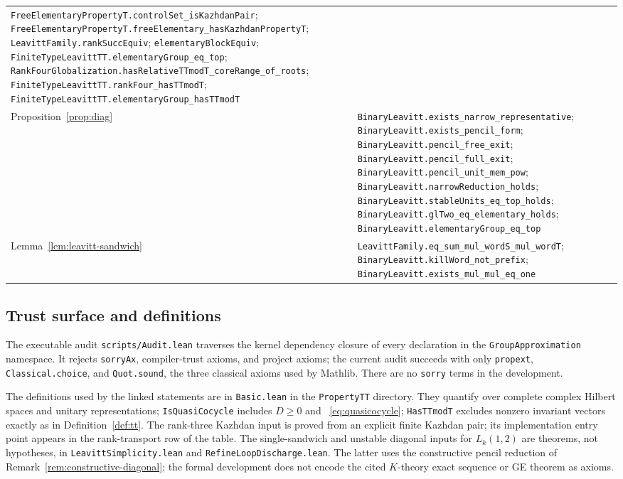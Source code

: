 \documentclass[11pt]{amsart}
\theoremstyle{definition}
\theoremstyle{plain}
\begin{document}
\begin{tabularx}{\textwidth}{@{}>{\raggedright\arraybackslash}p{}>{\raggedright\arraybackslash}X@{}}
\nolinkurl{FreeElementaryPropertyT.controlSet_isKazhdanPair};
\nolinkurl{FreeElementaryPropertyT.freeElementary_hasKazhdanPropertyT};
\nolinkurl{LeavittFamily.rankSuccEquiv};
\nolinkurl{elementaryBlockEquiv};
\nolinkurl{FiniteTypeLeavittTT.elementaryGroup_eq_top};
\nolinkurl{RankFourGlobalization.hasRelativeTTmodT_coreRange_of_roots};
\nolinkurl{FiniteTypeLeavittTT.rankFour_hasTTmodT};
\nolinkurl{FiniteTypeLeavittTT.elementaryGroup_hasTTmodT} \\
Proposition~\ref{prop:diag} &
\nolinkurl{BinaryLeavitt.exists_narrow_representative};
\nolinkurl{BinaryLeavitt.exists_pencil_form};
\nolinkurl{BinaryLeavitt.pencil_free_exit};
\nolinkurl{BinaryLeavitt.pencil_full_exit};
\nolinkurl{BinaryLeavitt.pencil_unit_mem_pow};
\nolinkurl{BinaryLeavitt.narrowReduction_holds};
\nolinkurl{BinaryLeavitt.stableUnits_eq_top_holds};
\nolinkurl{BinaryLeavitt.glTwo_eq_elementary_holds};
\nolinkurl{BinaryLeavitt.elementaryGroup_eq_top} \\
Lemma~\ref{lem:leavitt-sandwich} &
\nolinkurl{LeavittFamily.eq_sum_mul_wordS_mul_wordT};
\nolinkurl{BinaryLeavitt.killWord_not_prefix};
\nolinkurl{BinaryLeavitt.exists_mul_mul_eq_one} \\
\bottomrule
\end{tabularx}
\endgroup

\subsection*{Trust surface and definitions}

The executable audit \nolinkurl{scripts/Audit.lean} traverses the
kernel dependency closure of every declaration in the
\nolinkurl{GroupApproximation} namespace.  It rejects
\nolinkurl{sorryAx}, compiler-trust axioms, and project axioms; the
current audit succeeds with only \nolinkurl{propext},
\nolinkurl{Classical.choice}, and \nolinkurl{Quot.sound}, the three
classical axioms used by Mathlib.  There are no \nolinkurl{sorry}
terms in the development.

The definitions used by the linked statements are in
\nolinkurl{Basic.lean} in the \nolinkurl{PropertyTT} directory.  They quantify
over complete complex Hilbert spaces and unitary representations;
\nolinkurl{IsQuasiCocycle} includes \(D\ge0\) and
~\eqref{eq:quasicocycle}; \nolinkurl{HasTTmodT} excludes nonzero
invariant vectors exactly as in Definition~\ref{def:tt}.  The
rank-three Kazhdan input is proved from an explicit finite Kazhdan
pair; its implementation entry point appears in the rank-transport
row of the table.
The single-sandwich and unstable diagonal inputs for \(L_k(1,2)\) are
theorems, not hypotheses, in \nolinkurl{LeavittSimplicity.lean} and
\nolinkurl{RefineLoopDischarge.lean}.
The latter uses the constructive pencil reduction of
Remark~\ref{rem:constructive-diagonal}; the formal development does
not encode the cited \(K\)-theory exact sequence or GE theorem as
axioms.
\end{document}
